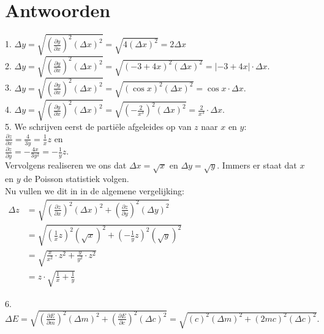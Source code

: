 \section{Antwoorden}
\label{/tussentoets-ii/antwoorden}

1. ${\Delta y = \sqrt{\left(\frac{\partial y}{\partial x}\right)^2 (\Delta x)^2 } = \sqrt{4 (\Delta x)^2}=2\Delta x}$\\


2. ${ \Delta y = \sqrt{\left(\frac{\partial y}{\partial x}\right)^2 (\Delta x)^2 } = \sqrt{(-3+4x)^2 (\Delta x)^2}= |{-3+4x}| \cdot \Delta x}.$\\


3. ${ \Delta y = \sqrt{\left(\frac{\partial y}{\partial x}\right)^2 (\Delta x)^2 } = \sqrt{(\cos x)^2 (\Delta x)^2}= \cos x \cdot \Delta x}.$\\


4. ${ \Delta y = \sqrt{\left(\frac{\partial y}{\partial x}\right)^2 (\Delta x)^2 } = \sqrt{\left( -\frac{2}{x^3} \right)^2 (\Delta x)^2}= \frac{2}{x^3} \cdot \Delta x}.$\\


5. We schrijven eerst de partiële afgeleides op van $z$ naar $x$ en $y$:\\
$\frac{\partial z}{\partial x} = \frac{4}{3y} = \frac{1}{x}z$ en \\
$\frac{\partial z}{\partial y} = - \frac{4x}{3y^2} = - \frac{1}{y} z.$\\
Vervolgens realiseren we ons dat $\Delta x = \sqrt{x}$ en $\Delta y = \sqrt{y}.$ Immers er staat dat $x$ en $y$ de Poisson statistiek volgen.\\
Nu vullen we dit in in de algemene vergelijking:\\
$\begin{aligned}
\Delta z & = \sqrt{ \left( \frac{\partial z}{\partial x}\right)^2 \left( \Delta x \right)^2 + \left( \frac{\partial z}{\partial y}\right)^2 \left( \Delta y \right)^2}\\
& =\sqrt{ \left( \frac{1}{x}z \right)^2  \left( \sqrt{x} \right)^2 +\left( - \frac{1}{y} z \right)^2 \left( \sqrt{y} \right)^2} \\
& = \sqrt{  \frac{x}{x^2} \cdot z^2 + \frac{y}{y^2} \cdot z^2} \\
& = z \cdot \sqrt{ \frac{1}{x} + \frac{1}{y}}
\end{aligned}$


6.  $ \Delta E = \sqrt{\left(\frac{\partial E}{\partial m}\right)^2 (\Delta m)^2 + \left(\frac{\partial E}{\partial c}\right)^2 (\Delta c)^2 } = \sqrt{(c)^2(\Delta m)^2 + (2mc)^2 (\Delta c)^2}.$\\


